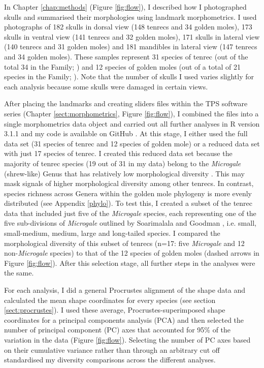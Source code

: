 	In Chapter \ref{chap:methods} (Figure \ref{fig:flow}), I described how I photographed skulls and summarised their morphologies using landmark morphometrics. I used photographs of 182 skulls in dorsal view (148 tenrecs and 34 golden moles), 173 skulls in ventral view (141 tenrecs and 32 golden moles), 171 skulls in lateral view (140 tenrecs and 31 golden moles) and 181 mandibles in lateral view (147 tenrecs and 34 golden moles). These samples represent 31 species of tenrec (out of the total 34 in the Family; \citealp{Olson2013}) and 12 species of golden moles (out of a total of 21 species in the Family; \citealp{Asher2010}). Note that the number of skulls I used varies slightly for each analysis because some skulls were damaged in certain views.
	

	After placing the landmarks and creating sliders files within the TPS software series (Chapter \ref{sect:morphometrics}, Figure \ref{fig:flow}), I combined the files into a single morphometrics data object and carried out all further analyses in R version 3.1.1 \citep{Team2014} and my code is available on GitHub \citep{Finlay2015c}. At this stage, I either used the full data set (31 species of tenrec and 12 species of golden mole) or a reduced data set with just 17 species of tenrec. I created this reduced data set because the majority of tenrec species (19 out of 31 in my data) belong to the \textit{Microgale} (shrew-like) Genus that has relatively low morphological diversity \citep{Soarimalala2011, Jenkins2003}. This may mask signals of higher morphological diversity among other tenrecs. In contrast, species richness across Genera within the golden mole phylogeny is more evenly distributed (see Appendix \ref{phylo}). To test this, I created a subset of the tenrec data that included just five of the \textit{Microgale} species, each representing one of the five sub-divisions of \textit{Microgale} outlined by Soarimalala and Goodman \citeyearpar{Soarimalala2011}, i.e. small, small-medium, medium, large and long-tailed species. I compared the morphological diversity of this subset of tenrecs (n=17: five \textit{Microgale} and 12 non-\textit{Microgale} species) to that of the 12 species of golden moles (dashed arrows in Figure \ref{fig:flow}). After this selection stage, all further steps in the analyses were the same.
		
	For each analysis, I did a general Procrustes alignment of the shape data and calculated the mean shape coordinates for every species (see section \ref{sect:procrustes}). I used these average, Procrustes-superimposed shape coordinates for a principal components analysis (PCA) and then selected the number of principal component (PC) axes that accounted for 95\% of the variation in the data (Figure \ref{fig:flow}). Selecting the number of PC axes based on their cumulative variance \citep[e.g.][]{Brusatte2008, Collar2006} rather than through an arbitrary cut off standardised my diversity comparisons across the different analyses.
	

